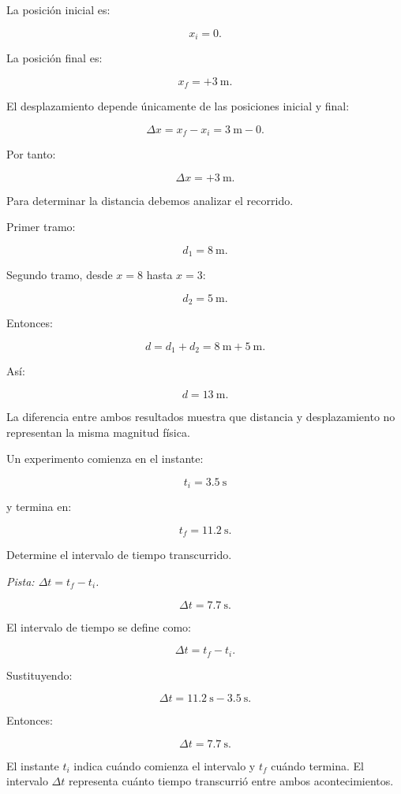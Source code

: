 \begin{explicacion}
La posición inicial es:

\[ x_i=0. \]

La posición final es:

\[ \boxed{x_f=+\SI{3}{\meter}}. \]

El desplazamiento depende únicamente de las posiciones inicial y final:

\[
\Delta x=x_f-x_i
=
\SI{3}{\meter}-0.
\]

Por tanto:

\[ \boxed{\Delta x=+\SI{3}{\meter}}. \]

Para determinar la distancia debemos analizar el recorrido.

Primer tramo:

\[ d_1=\SI{8}{\meter}. \]

Segundo tramo, desde \(x=8\) hasta \(x=3\):

\[ d_2=\SI{5}{\meter}. \]

Entonces:

\[
d=d_1+d_2
=
\SI{8}{\meter}
+
\SI{5}{\meter}.
\]

Así:

\[ \boxed{d=\SI{13}{\meter}}. \]

La diferencia entre ambos resultados muestra que distancia y desplazamiento no representan la misma magnitud física.
\end{explicacion}


\begin{ejercicio}
Un experimento comienza en el instante:

\[ t_i=\SI{3.5}{\second} \]

y termina en:

\[ t_f=\SI{11.2}{\second}. \]

Determine el intervalo de tiempo transcurrido.

\textit{Pista: \(\Delta t=t_f-t_i\).}
\end{ejercicio}

\begin{respuesta}
\[ \boxed{\Delta t=\SI{7.7}{\second}}. \]
\end{respuesta}

\begin{explicacion}
El intervalo de tiempo se define como:

\[ \Delta t=t_f-t_i. \]

Sustituyendo:

\[
\Delta t
=
\SI{11.2}{\second}
-
\SI{3.5}{\second}.
\]

Entonces:

\[ \boxed{\Delta t=\SI{7.7}{\second}}. \]

El instante \(t_i\) indica cuándo comienza el intervalo y \(t_f\) cuándo termina. El intervalo \(\Delta t\) representa cuánto tiempo transcurrió entre ambos acontecimientos.
\end{explicacion}


